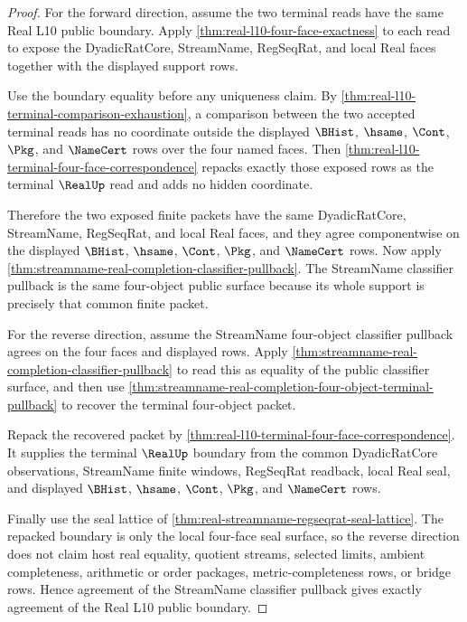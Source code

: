 \begin{proof}
For the forward direction, assume the two terminal reads have the same Real L10 public boundary. Apply \autoref{thm:real-l10-four-face-exactness} to each read to expose the DyadicRatCore, StreamName, RegSeqRat, and local Real faces together with the displayed support rows.

Use the boundary equality before any uniqueness claim. By \autoref{thm:real-l10-terminal-comparison-exhaustion}, a comparison between the two accepted terminal reads has no coordinate outside the displayed $\BHist$, $\hsame$, $\Cont$, $\Pkg$, and $\NameCert$ rows over the four named faces. Then \autoref{thm:real-l10-terminal-four-face-correspondence} repacks exactly those exposed rows as the terminal $\RealUp$ read and adds no hidden coordinate.

Therefore the two exposed finite packets have the same DyadicRatCore, StreamName, RegSeqRat, and local Real faces, and they agree componentwise on the displayed $\BHist$, $\hsame$, $\Cont$, $\Pkg$, and $\NameCert$ rows. Now apply \autoref{thm:streamname-real-completion-classifier-pullback}. The StreamName classifier pullback is the same four-object public surface because its whole support is precisely that common finite packet.

For the reverse direction, assume the StreamName four-object classifier pullback agrees on the four faces and displayed rows. Apply \autoref{thm:streamname-real-completion-classifier-pullback} to read this as equality of the public classifier surface, and then use \autoref{thm:streamname-real-completion-four-object-terminal-pullback} to recover the terminal four-object packet.

Repack the recovered packet by \autoref{thm:real-l10-terminal-four-face-correspondence}. It supplies the terminal $\RealUp$ boundary from the common DyadicRatCore observations, StreamName finite windows, RegSeqRat readback, local Real seal, and displayed $\BHist$, $\hsame$, $\Cont$, $\Pkg$, and $\NameCert$ rows.

Finally use the seal lattice of \autoref{thm:real-streamname-regseqrat-seal-lattice}. The repacked boundary is only the local four-face seal surface, so the reverse direction does not claim host real equality, quotient streams, selected limits, ambient completeness, arithmetic or order packages, metric-completeness rows, or bridge rows. Hence agreement of the StreamName classifier pullback gives exactly agreement of the Real L10 public boundary.
\end{proof}

